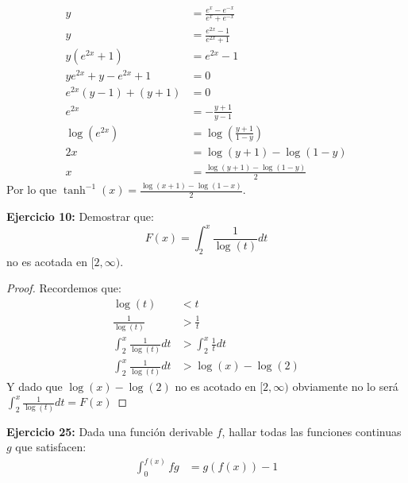 \documentclass[../main.tex]{subfiles}
\begin{document}
\begin{align*}
    y &= \frac{e^x - e^{-x}}{e^x + e^{-x}}\\
    y &= \frac{e^{2x} - 1}{e^{2x} + 1}\\
    y(e^{2x} + 1) &= e^{2x}-1\\
    ye^{2x} + y - e^{2x} + 1 &= 0\\
    e^{2x}(y-1) + (y+1) &= 0\\
    e^{2x} &= -\frac{y+1}{y-1}\\
    \log(e^{2x}) &= \log\left(\frac{y+1}{1-y}\right)\\
    2x &= \log(y+1) - \log(1-y)\\
    x &= \frac{\log(y+1)-\log(1-y)}{2}
\end{align*}
Por lo que $\tanh^{-1}(x) = \frac{\log(x+1)-\log(1-x)}{2}$.

\question \textbf{Ejercicio 10:} Demostrar que:
$$F(x) = \int_2^x \frac{1}{\log(t)} dt$$
no es acotada en $[2, \infty)$.
\begin{proof}
    Recordemos que:
    \begin{align*}
        \log(t) &< t\\
        \frac{1}{\log(t)} &> \frac{1}{t}\\
        \int_{2}^x \frac{1}{\log(t)} dt &> \int_{2}^x \frac{1}{t} dt\\
        \int_{2}^x \frac{1}{\log(t)} dt &> \log(x)-\log(2)
    \end{align*}
    Y dado que $\log(x)-\log(2)$ no es acotado en $[2, \infty)$ obviamente no lo será $\int_{2}^x \frac{1}{\log(t)} dt = F(x)$
\end{proof}

\question \textbf{Ejercicio 25:} Dada una función derivable $f$, hallar todas las funciones continuas $g$ que satisfacen:
\begin{align*}
    \int_0^{f(x)} fg &= g(f(x)) - 1
\end{align*}
\end{document}
